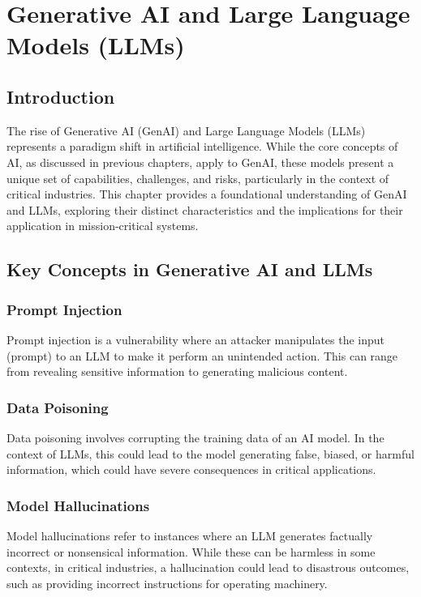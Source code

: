 \chapter{Generative AI and Large Language Models (LLMs)}
\label{cha:generative_ai_and_llms}

\section{Introduction}

The rise of Generative AI (GenAI) and Large Language Models (LLMs) represents a paradigm shift in artificial intelligence. While the core concepts of AI, as discussed in previous chapters, apply to GenAI, these models present a unique set of capabilities, challenges, and risks, particularly in the context of critical industries. This chapter provides a foundational understanding of GenAI and LLMs, exploring their distinct characteristics and the implications for their application in mission-critical systems.

\section{Key Concepts in Generative AI and LLMs}

\subsection{Prompt Injection}

Prompt injection is a vulnerability where an attacker manipulates the input (prompt) to an LLM to make it perform an unintended action. This can range from revealing sensitive information to generating malicious content.

\subsection{Data Poisoning}

Data poisoning involves corrupting the training data of an AI model. In the context of LLMs, this could lead to the model generating false, biased, or harmful information, which could have severe consequences in critical applications.

\subsection{Model Hallucinations}

Model hallucinations refer to instances where an LLM generates factually incorrect or nonsensical information. While these can be harmless in some contexts, in critical industries, a hallucination could lead to disastrous outcomes, such as providing incorrect instructions for operating machinery.

